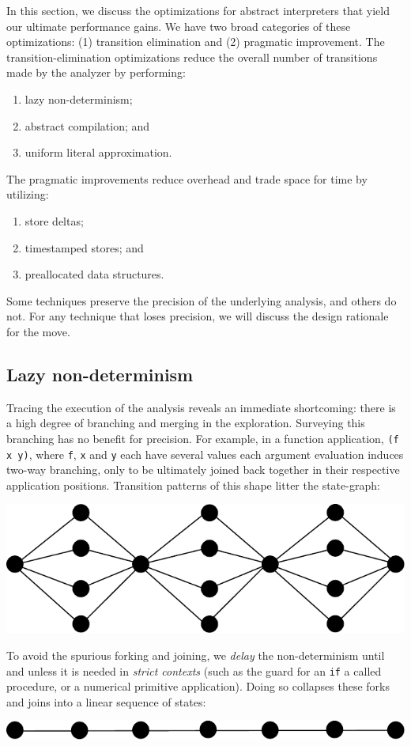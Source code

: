 \documentclass[preprint,onecolumn,9pt]{sigplanconf} %
\begin{document}
In this section, we discuss the optimizations for abstract interpreters that
yield our ultimate performance gains.
%
We have two broad categories of these optimizations: (1) transition elimination
and (2) pragmatic improvement.
%
The transition-elimination optimizations reduce the overall number of transitions
made by the analyzer by performing:
\begin{enumerate}
 \item lazy non-determinism;
 \item abstract compilation; and
 \item uniform literal approximation.
\end{enumerate}
The pragmatic improvements reduce overhead and trade space for time
by utilizing:
\begin{enumerate}
 \item store deltas;
 \item timestamped stores; and
 \item preallocated data structures.
\end{enumerate}

Some techniques preserve the precision of the underlying analysis, and others
do not.
%
For any technique that loses precision, we will discuss the design rationale
for the move.


\subsection{Lazy non-determinism}

Tracing the execution of the analysis reveals an immediate shortcoming:
there is a high degree of branching and merging in the exploration.
%
Surveying this branching has no benefit for precision.
%
For example, in a function application, {\tt (f x y)},
where {\tt f}, {\tt x} and {\tt y} each have several values
each argument evaluation induces two-way branching, only to be ultimately joined back together in their respective
application positions. 
%
Transition patterns of this shape litter the state-graph:
%
\begin{center}
\includegraphics[scale=0.3]{fanout.pdf}
\end{center}
To avoid the spurious forking and joining, we {\it delay} the non-determinism
until and unless it is needed in {\it strict contexts} (such as the guard for an
{\tt if} a called procedure, or a numerical primitive application). 
%
Doing so collapses these forks and joins into a linear sequence of states:
\begin{center}
\includegraphics[scale=0.3]{lazy.pdf}
\end{center}
\end{document}
